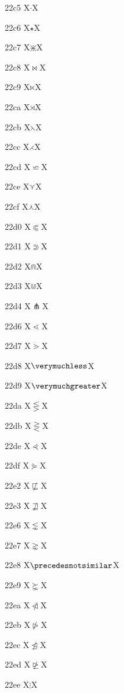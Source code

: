 \documentclass[11pt]{article}
\begin{document}
22c5 X{\ensuremath{\cdot}}X

22c6 X{\ensuremath{\star}}X

22c7 X{\ensuremath{\divideontimes}}X

22c8 X{\ensuremath{\bowtie}}X

22c9 X{\ensuremath{\ltimes}}X

22ca X{\ensuremath{\rtimes}}X

22cb X{\ensuremath{\leftthreetimes}}X

22cc X{\ensuremath{\rightthreetimes}}X

22cd X{\ensuremath{\backsimeq}}X

22ce X{\ensuremath{\curlyvee}}X

22cf X{\ensuremath{\curlywedge}}X

22d0 X{\ensuremath{\Subset}}X

22d1 X{\ensuremath{\Supset}}X

22d2 X{\ensuremath{\Cap}}X

22d3 X{\ensuremath{\Cup}}X

22d4 X{\ensuremath{\pitchfork}}X

22d6 X{\ensuremath{\lessdot}}X

22d7 X{\ensuremath{\gtrdot}}X

22d8 X{\ensuremath{\verymuchless}}X

22d9 X{\ensuremath{\verymuchgreater}}X

22da X{\ensuremath{\lesseqgtr}}X

22db X{\ensuremath{\gtreqless}}X

22de X{\ensuremath{\curlyeqprec}}X

22df X{\ensuremath{\curlyeqsucc}}X

22e2 X{\ensuremath{\not\sqsubseteq}}X

22e3 X{\ensuremath{\not\sqsupseteq}}X

22e6 X{\ensuremath{\lnsim}}X

22e7 X{\ensuremath{\gnsim}}X

22e8 X{\ensuremath{\precedesnotsimilar}}X

22e9 X{\ensuremath{\succnsim}}X

22ea X{\ensuremath{\ntriangleleft}}X

22eb X{\ensuremath{\ntriangleright}}X

22ec X{\ensuremath{\ntrianglelefteq}}X

22ed X{\ensuremath{\ntrianglerighteq}}X

22ee X{\ensuremath{\vdots}}X
\end{document}
